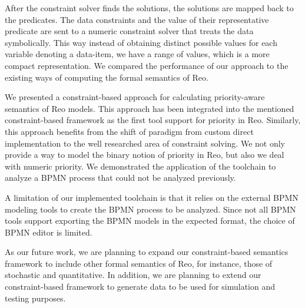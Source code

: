 After the constraint solver finds the solutions, the solutions are mapped back to the predicates. The data constraints and the value of their representative predicate are sent to a numeric constraint solver that treats the data symbolically. This way instead of obtaining distinct  possible values for each variable denoting a data-item, we have a range of values, which is a more compact representation. We compared the performance of our approach to the existing ways of computing the formal semantics of Reo.


We presented a constraint-based approach for calculating priority-aware semantics of Reo models. This approach has been integrated into the mentioned constraint-based framework as the first tool support for priority in Reo. Similarly, this approach benefits from the shift of paradigm from custom direct implementation to the well researched area of constraint solving. We not only provide a way to model the binary notion of priority in Reo, but also we deal with numeric priority. We demonstrated the application of the toolchain to analyze a BPMN process that could not be analyzed previously. 

A limitation of our implemented toolchain is that it relies on the external BPMN modeling tools to create the BPMN process to be analyzed. Since not all BPMN tools support exporting the BPMN models in the expected format, the choice of BPMN editor is limited. 

As our future work, we are planning to expand our constraint-based semantics framework to include other formal semantics of Reo, for instance, those of stochastic and quantitative. In addition, we are planning to extend our constraint-based framework to generate data to be used for simulation and testing purposes.
